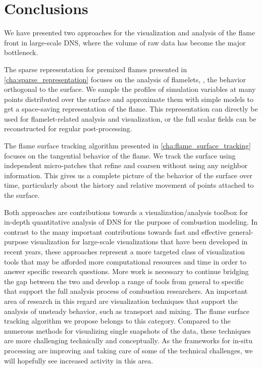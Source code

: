 \chapter{Conclusions} %
\label{cha:flame_vis_conclusions}
%
We have presented two approaches for the visualization and analysis of the flame
front in large-scale \ac{DNS}, where the volume of raw data has become the major
bottleneck.
%

%
The sparse representation for premixed flames presented in
\cref{cha:sparse_representation} focuses on the analysis of flamelets, \ie, the
behavior orthogonal to the surface.
%
We sample the profiles of simulation variables at many points distributed over
the surface and approximate them with simple models to get a space-saving
representation of the flame.
%
This representation can directly be used for flamelet-related analysis and
visualization, or the full scalar fields can be reconstructed for regular
post-processing.
%

%
The flame surface tracking algorithm presented in
\cref{cha:flame_surface_tracking} focuses on the tangential behavior of the
flame.
%
We track the surface using independent micro-patches that refine and coarsen
without using any neighbor information.
%
This gives us a complete picture of the behavior of the surface over time,
particularly about the history and relative movement of points attached to the
surface.
%

%
Both approaches are contributions towards a visualization/analysis toolbox for
in-depth quantitative analysis of \ac{DNS} for the purpose of combustion
modeling.
%
In contrast to the many important contributions towards fast and effective
general-purpose visualization for large-scale visualizations that have been
developed in recent years, these approaches represent a more targeted class
of visualization tools that may be afforded more computational resources and
time in order to answer specific research questions.
%
More work is necessary to continue bridging the gap between the two and
develop a range of tools from general to specific that support the full analysis
process of combustion researchers.
%
An important area of research in this regard are visualization techniques that
support the analysis of unsteady behavior, such as transport and mixing.
%
The flame surface tracking algorithm we propose belongs to this category.
%
Compared to the numerous methods for visualizing single snapshots of the data,
these techniques are more challenging technically and conceptually.
%
As the frameworks for in-situ processing are improving and taking care of some
of the technical challenges, we will hopefully see increased activity in this
area.
%
